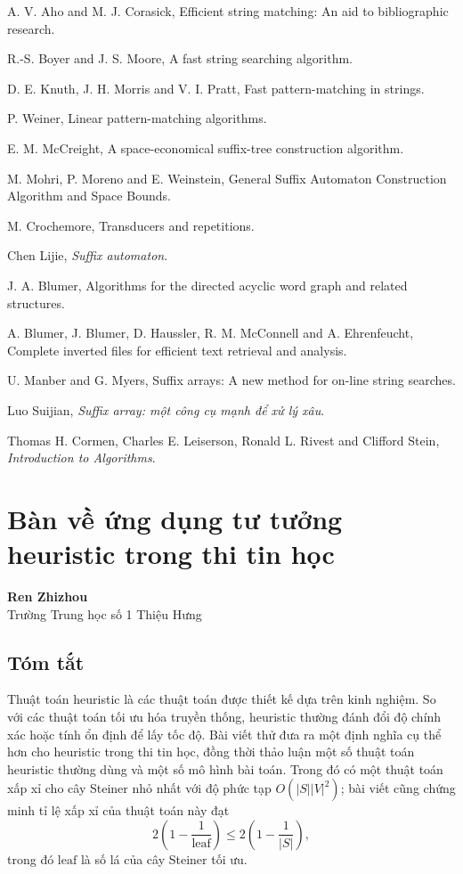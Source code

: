 \documentclass[11pt]{article}
\begin{document}
\begin{enumerate}[label={[\arabic*]},leftmargin=3em]
  \item A. V. Aho and M. J. Corasick, Efficient string matching: An aid to bibliographic research.
  \item R.-S. Boyer and J. S. Moore, A fast string searching algorithm.
  \item D. E. Knuth, J. H. Morris and V. I. Pratt, Fast pattern-matching in strings.
  \item P. Weiner, Linear pattern-matching algorithms.
  \item E. M. McCreight, A space-economical suffix-tree construction algorithm.
  \item M. Mohri, P. Moreno and E. Weinstein, General Suffix Automaton Construction Algorithm and Space Bounds.
  \item M. Crochemore, Transducers and repetitions.
  \item Chen Lijie, \emph{Suffix automaton}.
  \item J. A. Blumer, Algorithms for the directed acyclic word graph and related structures.
  \item A. Blumer, J. Blumer, D. Haussler, R. M. McConnell and A. Ehrenfeucht, Complete inverted files for efficient text retrieval and analysis.
  \item U. Manber and G. Myers, Suffix arrays: A new method for on-line string searches.
  \item Luo Suijian, \emph{Suffix array: một công cụ mạnh để xử lý xâu}.
  \item Thomas H. Cormen, Charles E. Leiserson, Ronald L. Rivest and Clifford Stein, \emph{Introduction to Algorithms}.
\end{enumerate}

\section{Bàn về ứng dụng tư tưởng heuristic trong thi tin học}

\begin{center}
\textbf{Ren Zhizhou}\\
Trường Trung học số 1 Thiệu Hưng
\end{center}

\subsection*{Tóm tắt}

Thuật toán heuristic là các thuật toán được thiết kế dựa trên kinh nghiệm. So
với các thuật toán tối ưu hóa truyền thống, heuristic thường đánh đổi độ chính
xác hoặc tính ổn định để lấy tốc độ. Bài viết thử đưa ra một định nghĩa cụ thể
hơn cho heuristic trong thi tin học, đồng thời thảo luận một số thuật toán
heuristic thường dùng và một số mô hình bài toán. Trong đó có một thuật toán
xấp xỉ cho cây Steiner nhỏ nhất với độ phức tạp \(O(|S||V|^2)\); bài viết cũng
chứng minh tỉ lệ xấp xỉ của thuật toán này đạt
\[
  2\left(1-\frac1{\mathrm{leaf}}\right)
  \le 2\left(1-\frac1{|S|}\right),
\]
trong đó \(\mathrm{leaf}\) là số lá của cây Steiner tối ưu.
\end{document}
